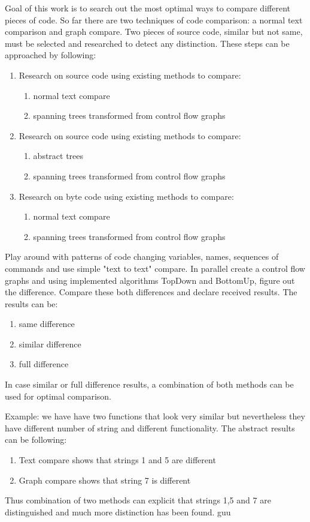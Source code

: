 Goal of this work is to search out the most optimal ways to compare different pieces of code. So far there are two techniques of code comparison: a normal text comparison and graph compare. 
Two pieces of source code, similar but not same, must be selected and researched to detect any distinction. These steps can be approached by following:

\begin{enumerate}
  \item Research on source code using existing methods to compare:
  	\begin{enumerate}
   	 	\item normal text compare
   		 \item spanning trees transformed from control flow graphs
	 \end{enumerate}	
  \item Research on source code using existing methods to compare:
  \begin{enumerate}
    \item abstract trees
    \item spanning trees transformed from control flow graphs
  \end{enumerate}
  \item Research on byte code using existing methods to compare:
  \begin{enumerate}
    \item normal text compare
    \item spanning trees transformed from control flow graphs
  \end{enumerate}
\end{enumerate}

	
Play around with patterns of code changing variables, names, sequences of commands and use simple "text to text" compare. In parallel create a control flow graphs and using implemented algorithms TopDown and BottomUp, figure out the difference. Compare these both differences and declare received results.
The results can be: 
\begin{enumerate}
  \item same difference
  \item similar difference
  \item full difference
\end{enumerate}
In case similar or full difference results, a combination of both methods can be used for optimal comparison. 

Example: we have have two functions that look very similar but nevertheless they have different number of string and different functionality. The abstract results can be following:
\begin{enumerate}
	\item Text compare shows that strings 1 and 5 are different
	\item Graph compare shows that string 7 is different 
\end{enumerate}

Thus combination of two methods can explicit that strings 1,5 and 7 are distinguished and much more distinction has been found.
guu